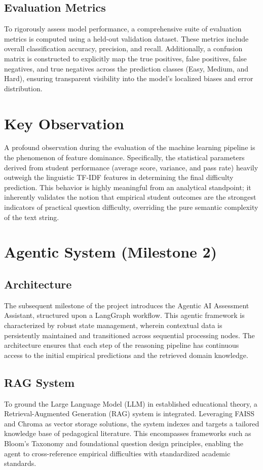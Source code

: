 \documentclass[12pt,a4paper]{article}
\begin{document}
\subsection{Evaluation Metrics}
To rigorously assess model performance, a comprehensive suite of evaluation metrics is computed using a held-out validation dataset. These metrics include overall classification accuracy, precision, and recall. Additionally, a confusion matrix is constructed to explicitly map the true positives, false positives, false negatives, and true negatives across the prediction classes (Easy, Medium, and Hard), ensuring transparent visibility into the model's localized biases and error distribution.

\section{Key Observation}
A profound observation during the evaluation of the machine learning pipeline is the phenomenon of feature dominance. Specifically, the statistical parameters derived from student performance (average score, variance, and pass rate) heavily outweigh the linguistic TF-IDF features in determining the final difficulty prediction. This behavior is highly meaningful from an analytical standpoint; it inherently validates the notion that empirical student outcomes are the strongest indicators of practical question difficulty, overriding the pure semantic complexity of the text string.

\section{Agentic System (Milestone 2)}

\subsection{Architecture}
The subsequent milestone of the project introduces the Agentic AI Assessment Assistant, structured upon a LangGraph workflow. This agentic framework is characterized by robust state management, wherein contextual data is persistently maintained and transitioned across sequential processing nodes. The architecture ensures that each step of the reasoning pipeline has continuous access to the initial empirical predictions and the retrieved domain knowledge.

\subsection{RAG System}
To ground the Large Language Model (LLM) in established educational theory, a Retrieval-Augmented Generation (RAG) system is integrated. Leveraging FAISS and Chroma as vector storage solutions, the system indexes and targets a tailored knowledge base of pedagogical literature. This encompasses frameworks such as Bloom's Taxonomy and foundational question design principles, enabling the agent to cross-reference empirical difficulties with standardized academic standards.
\end{document}

